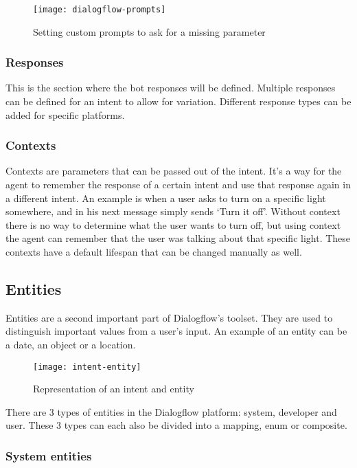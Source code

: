 \begin{figure}[ht]
	\centering
	\texttt{[image: dialogflow-prompts]}
	\caption{Setting custom prompts to ask for a missing parameter}
	\label{fig:dialogflow-prompts}
\end{figure}

\subsubsection{Responses}

This is the section where the bot responses will be defined. Multiple responses can be defined for an intent to allow for variation. Different response types can be added for specific platforms.

\subsubsection{Contexts}

Contexts are parameters that can be passed out of the intent. It's a way for the agent to remember the response of a certain intent and use that response again in a different intent. An example is when a user asks to turn on a specific light somewhere, and in his next message simply sends `Turn it off'. Without context there is no way to determine what the user wants to turn off, but using context the agent can remember that the user was talking about that specific light. These contexts have a default lifespan that can be changed manually as well.

\subsection{Entities}

Entities are a second important part of Dialogflow's toolset. They are used to distinguish important values from a user's input. An example of an entity can be a date, an object or a location.

\begin{figure}[ht]
	\centering
	\texttt{[image: intent-entity]}
	\caption{Representation of an intent and entity}
	\label{fig:intent-entity}
\end{figure}

There are 3 types of entities in the Dialogflow platform: system, developer and user. These 3 types can each also be divided into a mapping, enum or composite.

\subsubsection{System entities}

